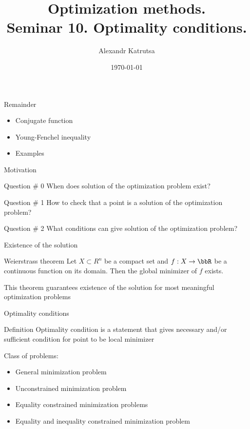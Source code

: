 \documentclass[12pt]{beamer}
\title[Seminar 10]{Optimization methods. \\
 Seminar 10. Optimality conditions.}
\author{Alexandr Katrutsa}
\institute{Moscow Institute of Physics and Technology\\
Department of Control and Applied Mathematics}
\date{\today}
\begin{document}
\begin{frame}
\maketitle
\end{frame}

\begin{frame}{Remainder}
\begin{itemize}
\item Conjugate function
\item Young-Fenchel inequality
\item Examples
\end{itemize}
\end{frame}

\begin{frame}{Motivation}

\begin{block}{Question \# 0}
When does solution of the optimization problem exist?
\end{block}

\begin{block}{Question \# 1}
How to check that a point is a solution of the optimization problem? 
\end{block}

\begin{block}{Question \# 2}
What conditions can give solution of the optimization problem?
\end{block}

\end{frame}

\begin{frame}{Existence of the solution}
\begin{block}{Weierstrass theorem}
Let $X \subset R^n$ be a compact set and $f: X \to \bbR$ be a continuous function on its domain.
Then the global minimizer of $f$ exists.
\end{block}

This theorem guarantees existence of the solution for most meaningful optimization problems
 
\end{frame}

\begin{frame}{Optimality conditions}
\begin{block}{Definition}
Optimality condition is a statement that gives necessary and/or sufficient condition for point to be local minimizer
\end{block}
Class of problems:
\begin{itemize}
\item General minimization problem
\item Unconstrained minimization problem 
\item Equality constrained minimization problems
\item Equality and inequality constrained minimization problem
\end{itemize}
\end{frame}
\end{document}
